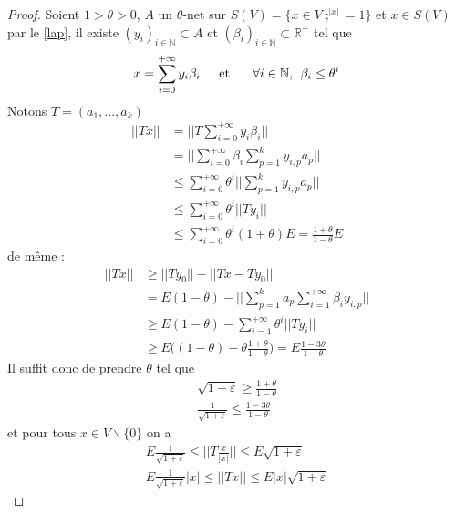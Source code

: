 \documentclass[12pt]{article}
\begin{document}
\begin{proof} 
	Soient $1>\theta>0$, $A$ un $\theta$-net sur $S(V)=\big\{x\in V \; ;^|x|=1\big\}$ et $x\in S(V)$ par le \ref{lap},  il existe $(y_i)_{i\in\mathbb{N}}\subset A$ et $(\beta_i)_{i\in\mathbb{N}}\subset \mathbb{R}^{+}$ tel que 
	\begin{equation*}
	x = \sum_{i=0}^{+\infty}y_i \beta_i \text{\hspace{4mm} et \hspace{4mm} $\forall i\in \mathbb{N}$, }\; \beta_i\leq \theta^i
	\end{equation*}
	Notons $T=(a_1,...,a_k)$
	\begin{align*}
		||Tx|| &= \big|\big| T\sum_{i=0}^{+\infty}y_i \beta_i\big|\big|\\
		&=  \big|\big| \sum_{i=0}^{+\infty}\beta_i \sum_{p=1}^{k}y_{i,p}a_p \big|\big|\\
		&\leq \sum_{i=0}^{+\infty}\theta^i ||\sum_{p=1}^{k}y_{i,p}a_p||\\
		&\leq \sum_{i=0}^{+\infty}\theta^i ||Ty_i||\\
		& \leq  \sum_{i=0}^{+\infty}\theta^i (1+\theta)E=\frac{1+\theta}{1-\theta}E
	\end{align*}
	de même :
	\begin{align*}
		||Tx|| &\geq||Ty_0||- ||Tx-Ty_0||\\
		&= E(1-\theta) - ||\sum_{p=1}^{k}a_p\sum_{i=1}^{+\infty}\beta_i y_{i,p}||\\
		&\geq E(1-\theta)- \sum_{i=1}^{+\infty}\theta^i ||Ty_i||\\
		&\geq E\big((1-\theta)- \theta\frac{1+\theta}{1-\theta}\big)= E \frac{1-3\theta}{1-\theta}
	\end{align*}
	Il suffit donc de prendre $\theta$ tel que
	\begin{equation*}
	\begin{array}{cc}
		\sqrt{1+\varepsilon}\geq \frac{1+\theta}{1-\theta}\\
		\frac{1}{\sqrt{1+\varepsilon}}\leq \frac{1-3\theta}{1-\theta}
	\end{array}
	\end{equation*}
	et pour tous $x\in V \backslash\{0\}$ on a 
	\begin{equation*}
		\begin{array}{cc}
			E\frac{1}{\sqrt{1+\varepsilon}}\leq\big|\big|T\frac{x}{|x|}\big|\big|\leq E \sqrt{1+\varepsilon}\\
			E\frac{1}{\sqrt{1+\varepsilon}}|x|\leq||Tx||\leq E|x|\sqrt{1+\varepsilon}
 		\end{array}

\end{equation*}
\end{proof}
\end{document}
